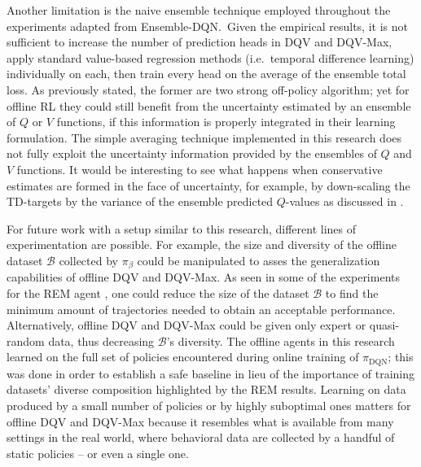 Another limitation is the naive ensemble technique employed throughout
the experiments adapted from Ensemble-DQN.\ Given the empirical
results, it is not sufficient to increase the number of prediction
heads in DQV and DQV-Max, apply standard value-based regression
methods (i.e.\ temporal difference learning) individually on each,
then train
every head on the average of the ensemble total loss. As
previously stated, the former are two strong off-policy algorithm; yet
for
offline RL they could still benefit from the uncertainty estimated by
an ensemble of $Q$ or $V$ functions, if this information is properly
integrated in their learning formulation. The simple averaging technique
implemented in this research does not fully exploit the uncertainty
information provided by the ensembles of $Q$ and $V$ functions. It
would be interesting to see what happens when conservative estimates
are formed in the face of uncertainty, for example, by down-scaling
the TD-targets by the variance of the ensemble predicted $Q$-values as
discussed in \citet{levine2020offline}.

For future work with a setup similar to this research, different lines
of experimentation are possible. For example, the size and diversity
of the offline dataset $\mathcal{B}$ collected by $\pi_{\beta}$ could
be manipulated to asses the generalization capabilities of offline DQV
and DQV-Max. As seen in some of the experiments for the REM agent
\citep{agarwal2020optimistic}, one could reduce the size of the
dataset
$\mathcal{B}$ to find the minimum amount of trajectories needed to
obtain an acceptable performance. Alternatively, offline DQV and
DQV-Max could be
given only expert or quasi-random data, thus decreasing $\mathcal{B}$'s
diversity. The offline agents in this research learned on the full set
of policies encountered during online training of $\pi_{\textrm{DQN}}$; this
was done in order to establish a safe baseline in lieu of the
importance of training datasets' diverse composition highlighted by
the REM results.
Learning on data produced by a small number of policies or by
highly suboptimal ones matters for offline DQV and DQV-Max because it
resembles what is available from many settings in the real world,
where behavioral data are collected by a handful of static policies --
or even a single one.

